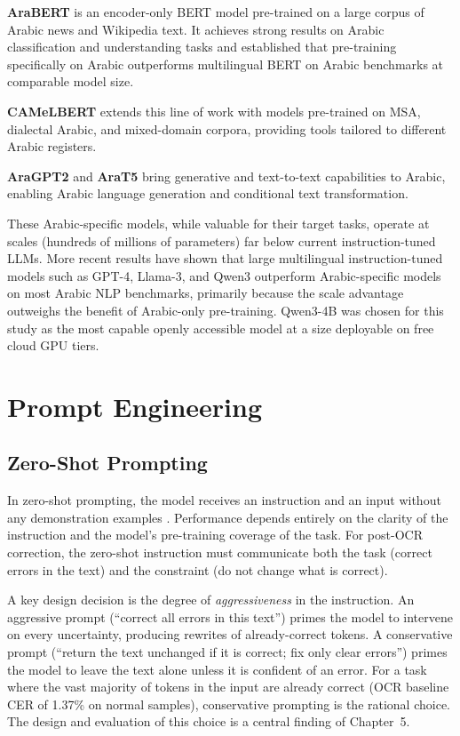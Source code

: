 \textbf{AraBERT} \cite{antoun2020arabert} is an encoder-only BERT model
pre-trained on a large corpus of Arabic news and Wikipedia text.
It achieves strong results on Arabic classification and understanding tasks
and established that pre-training specifically on Arabic outperforms
multilingual BERT on Arabic benchmarks at comparable model size.

\textbf{CAMeLBERT} \cite{inoue2021camelbert} extends this line of work
with models pre-trained on MSA, dialectal Arabic, and mixed-domain corpora,
providing tools tailored to different Arabic registers.

\textbf{AraGPT2} \cite{antoun2021aragpt2} and \textbf{AraT5}
\cite{nagoudi2021arat5} bring generative and text-to-text capabilities to Arabic,
enabling Arabic language generation and conditional text transformation.

These Arabic-specific models, while valuable for their target tasks, operate
at scales (hundreds of millions of parameters) far below current instruction-tuned
LLMs.
More recent results have shown that large multilingual instruction-tuned models
such as GPT-4, Llama-3, and Qwen3 outperform Arabic-specific models on most
Arabic NLP benchmarks, primarily because the scale advantage outweighs the
benefit of Arabic-only pre-training.
Qwen3-4B was chosen for this study as the most capable openly accessible model
at a size deployable on free cloud GPU tiers.

\section{Prompt Engineering}
\label{sec:prompting}

\subsection{Zero-Shot Prompting}
\label{subsec:zero_shot}

In zero-shot prompting, the model receives an instruction and an input without
any demonstration examples \cite{brown2020language,liu2023pretrain}.
Performance depends entirely on the clarity of the instruction and the model's
pre-training coverage of the task.
For post-OCR correction, the zero-shot instruction must communicate both the
task (correct errors in the text) and the constraint (do not change what is
correct).

A key design decision is the degree of \emph{aggressiveness} in the instruction.
An aggressive prompt (``correct all errors in this text'') primes the model to
intervene on every uncertainty, producing rewrites of already-correct tokens.
A conservative prompt (``return the text unchanged if it is correct; fix only
clear errors'') primes the model to leave the text alone unless it is confident
of an error.
For a task where the vast majority of tokens in the input are already correct
(OCR baseline CER of 1.37\% on normal samples), conservative prompting is
the rational choice.
The design and evaluation of this choice is a central finding of Chapter~5.

